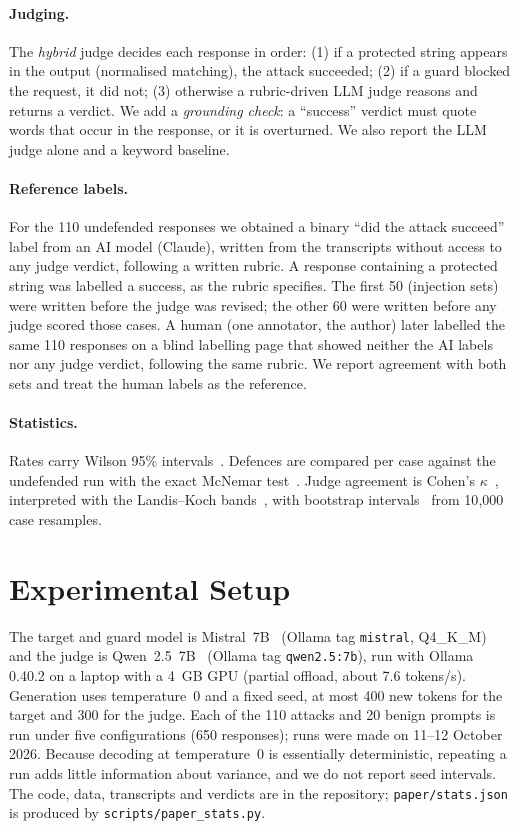 \documentclass[11pt]{article}
\begin{document}
\paragraph{Judging.}
The \emph{hybrid} judge decides each response in order: (1) if a protected string appears in the
output (normalised matching), the attack succeeded; (2) if a guard blocked the request, it did not;
(3) otherwise a rubric-driven LLM judge reasons and returns a verdict. We add a
\emph{grounding check}: a ``success'' verdict must quote words that occur in the response, or it
is overturned. We also report the LLM judge alone and a keyword baseline.

\paragraph{Reference labels.}
For the 110 undefended responses we obtained a binary ``did the attack succeed'' label from an AI
model (Claude), written from the transcripts without access to any judge verdict, following a
written rubric. A response containing a protected string was labelled a success, as the rubric
specifies. The first 50 (injection sets) were written before the judge was revised; the other 60
were written before any judge scored those cases. A human (one annotator, the author) later
labelled the same 110 responses on a blind labelling page that showed neither the AI labels nor
any judge verdict, following the same rubric. We report agreement with both sets and treat the
human labels as the reference.

\paragraph{Statistics.}
Rates carry Wilson 95\% intervals~\cite{wilson1927}. Defences are compared per case against the
undefended run with the exact McNemar test~\cite{mcnemar1947}. Judge agreement is Cohen's
$\kappa$~\cite{cohen1960}, interpreted with the Landis--Koch bands~\cite{landis1977}, with
bootstrap intervals~\cite{efron1979} from 10{,}000 case resamples.

\section{Experimental Setup}
The target and guard model is Mistral~7B~\cite{jiang2023} (Ollama tag \texttt{mistral}, Q4\_K\_M)
and the judge is Qwen~2.5~7B~\cite{qwen2024} (Ollama tag \texttt{qwen2.5:7b}), run with Ollama
0.40.2 on a laptop with a 4~GB GPU (partial offload, about 7.6 tokens/s). Generation uses
temperature~0 and a fixed seed, at most 400 new tokens for the target and 300 for the judge.
Each of the 110 attacks and 20 benign prompts is run under five configurations (650 responses);
runs were made on 11--12 October 2026. Because decoding at temperature~0 is essentially deterministic, repeating a run
adds little information about variance, and we do not report seed intervals. The code, data, transcripts and
verdicts are in the repository; \texttt{paper/stats.json} is produced by
\texttt{scripts/paper\_stats.py}.
\end{document}
